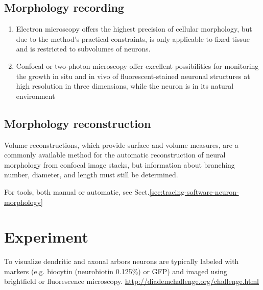\subsection{Morphology recording}

\begin{enumerate}

  \item Electron microscopy offers the highest precision of cellular morphology, but due
to the method's practical constraints, is only applicable to fixed tissue and is
restricted to subvolumes of neurons. 
  
  \item  Confocal or two-photon microscopy offer excellent
possibilities for monitoring the growth in situ and in vivo of
fluorescent-stained neuronal structures at high resolution in three dimensions,
while the neuron is in its natural environment
\end{enumerate}

\subsection{Morphology reconstruction}

Volume reconstructions, which provide surface and volume
measures, are a commonly available method for the automatic
reconstruction of neural morphology from confocal image
stacks, but information about branching number, diameter, and
length must still be determined.

For tools, both manual or automatic, see
Sect.\ref{sec:tracing-software-neuron-morphology}

\section{Experiment}


To visualize dendritic and axonal arbors neurons are typically labeled with
markers (e.g. biocytin (neurobiotin 0.125\%) or GFP) and imaged using
brightfield or fluorescence microscopy.
\url{http://diademchallenge.org/challenge.html}

